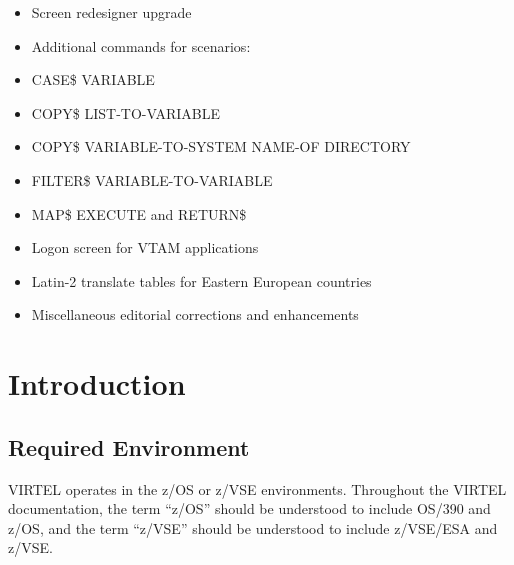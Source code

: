 \documentclass[letterpaper,10pt,english]{sphinxmanual}
\begin{document}
\begin{itemize}
\item {} 
Screen redesigner upgrade

\item {} 
Additional commands for scenarios:

\item {} 
CASE\$ VARIABLE

\item {} 
COPY\$ LIST-TO-VARIABLE

\item {} 
COPY\$ VARIABLE-TO-SYSTEM NAME-OF DIRECTORY

\item {} 
FILTER\$ VARIABLE-TO-VARIABLE

\item {} 
MAP\$ EXECUTE and RETURN\$

\end{itemize}

\begin{itemize}
\item {} 
Logon screen for VTAM applications

\item {} 
Latin-2 translate tables for Eastern European countries

\item {} 
Miscellaneous editorial corrections and enhancements

\end{itemize}


\chapter{Introduction}
\label{\detokenize{Installation_Guide:introduction}}\label{\detokenize{Installation_Guide:vvrrig60-introduction}}
\ignorespaces 

\section{Required Environment}
\label{\detokenize{Installation_Guide:required-environment}}\label{\detokenize{Installation_Guide:index-0}}
VIRTEL operates in the z/OS or z/VSE environments. Throughout the VIRTEL documentation, the term “z/OS” should be understood to include OS/390 and z/OS, and the term “z/VSE” should be understood to include z/VSE/ESA and z/VSE.
\end{document}
